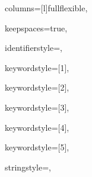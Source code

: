 {%
columns=[l]fullflexible,

keepspaces=true,

identifierstyle={\ttfamily\color{black}},

keywordstyle=[1]{\ttfamily\color{dkviolet}},

keywordstyle=[2]{\ttfamily\color{dkgreen}},

keywordstyle=[3]{\ttfamily\color{lightblue}},

keywordstyle=[4]{\ttfamily\color{dkblue}},

keywordstyle=[5]{\ttfamily\color{red}},



stringstyle=\ttfamily,


}



